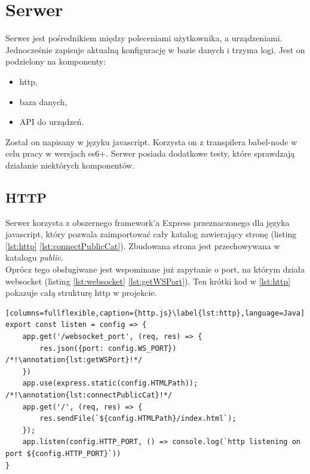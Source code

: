 \section{Serwer}
Serwer jest pośrednikiem między poleceniami użytkownika, a urządzeniami. Jednocześnie zapisuje aktualną konfigurację w bazie danych i trzyma logi. Jest on podzielony na komponenty:
\begin{itemize}
    \item http,
    \item baza danych,
    \item API do urządzeń.
\end{itemize}
Został on napisany w języku javascript. Korzysta on z transpilera babel-node w celu pracy w wersjach es6+. Serwer posiada dodatkowe testy, które sprawdzają działanie niektórych komponentów.
\subsection{HTTP}
Serwer korzysta z obszernego framework'a Express \cite{express} przeznaczonego dla języka javascript, który pozwala zaimportować cały katalog zawierający stronę (listing \ref{lst:http} \ref{lst:connectPublicCat}). Zbudowana strona jest przechowywana w katalogu \textit{public}.\\
Oprócz tego obsługiwane jest wspominane już zapytanie o port, na którym działa websocket (listing \ref{lst:websocket} \ref{lst:getWSPort}).
Ten krótki kod w \ref{lst:http} pokazuje całą strukturę http w projekcie.
\begin{lstlisting}[columns=fullflexible,caption={http.js}\label{lst:http},language=Java]
export const listen = config => {
    app.get('/websocket_port', (req, res) => {
        res.json({port: config.WS_PORT}) /*!\annotation{lst:getWSPort}!*/
    })
    app.use(express.static(config.HTMLPath)); /*!\annotation{lst:connectPublicCat}!*/
    app.get('/', (req, res) => {
        res.sendFile(`${config.HTMLPath}/index.html`);
    });
    app.listen(config.HTTP_PORT, () => console.log(`http listening on port ${config.HTTP_PORT}`))
}
\end{lstlisting}
